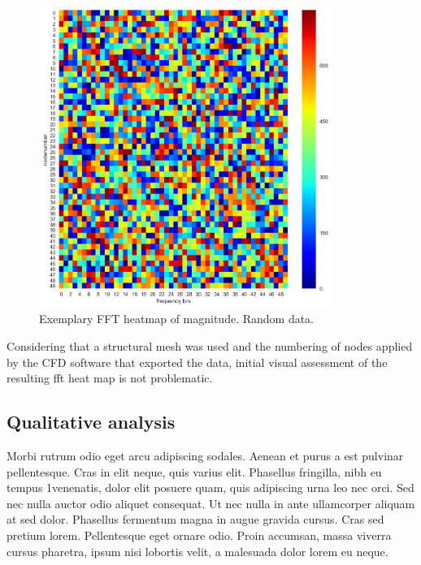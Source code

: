 \begin{figure}[h!]
\centering %
\includegraphics[width=0.85\textwidth]{Pictures/fft_heat.png}
\caption{Exemplary FFT heatmap of magnitude. Random data.}
\label{fft_heat}
\end{figure}

Considering that a structural mesh was used and the numbering of nodes applied by the CFD software that exported the data, initial visual assessment of the resulting fft heat map is not problematic.

\subsection{Qualitative analysis} \label{fft_res_qual}
Morbi rutrum odio eget arcu adipiscing sodales. Aenean et purus a est pulvinar pellentesque. Cras in elit neque, quis varius elit. Phasellus fringilla, nibh eu tempus 1venenatis, dolor elit posuere quam, quis adipiscing urna leo nec orci. Sed nec nulla auctor odio aliquet consequat. Ut nec nulla in ante ullamcorper aliquam at sed dolor. Phasellus fermentum magna in augue gravida cursus. Cras sed pretium lorem. Pellentesque eget ornare odio. Proin accumsan, massa viverra cursus pharetra, ipsum nisi lobortis velit, a malesuada dolor lorem eu neque.


